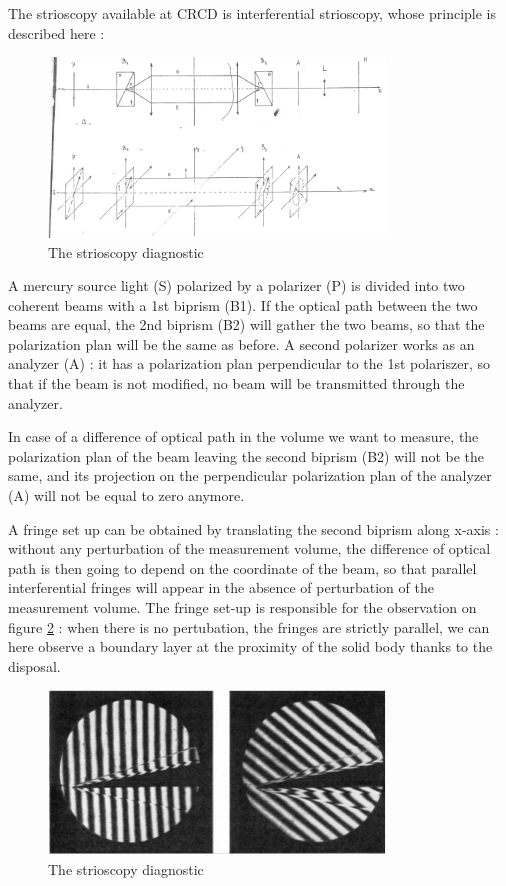 The strioscopy available at CRCD is interferential strioscopy, whose principle is described here :
\begin{figure}[!h]
  \centering
\includegraphics[width=0.8\textwidth]{fig/Principe_Strio.PNG}
  \caption{The strioscopy diagnostic}
 \label{principe_strio}
\end{figure}
A mercury source light (S) polarized by a polarizer (P) is divided into two coherent beams with a 1st biprism (B1). If the optical path between the two beams are equal, the 2nd biprism (B2) will gather the two beams, so that the polarization plan will be the same as before. A second polarizer works as an analyzer (A) : it  has a polarization plan perpendicular to the 1st polariszer, so that if the beam is not modified, no beam will be transmitted through the analyzer.

In case of a difference of optical path in the volume we want to measure, the polarization plan of the beam leaving the second biprism (B2) will not be the same, and its projection on the perpendicular polarization plan of the analyzer (A) will not be equal to zero anymore.

A fringe set up can be obtained by translating the second biprism along x-axis : without any perturbation of the measurement volume, the difference of optical path is then going to depend on the coordinate of the beam, so that parallel interferential fringes will appear in the absence of  perturbation of the measurement volume. The fringe set-up is responsible for the observation on figure \ref{image_strio} : when there is no pertubation, the fringes are strictly parallel, we can here observe a boundary layer at the proximity of the solid body thanks to the disposal.

\begin{figure}[!h]
  \centering
\includegraphics[width=0.8\textwidth]{fig/Strioscopie.PNG}
  \caption{The strioscopy diagnostic}
 \label{image_strio}
\end{figure}


